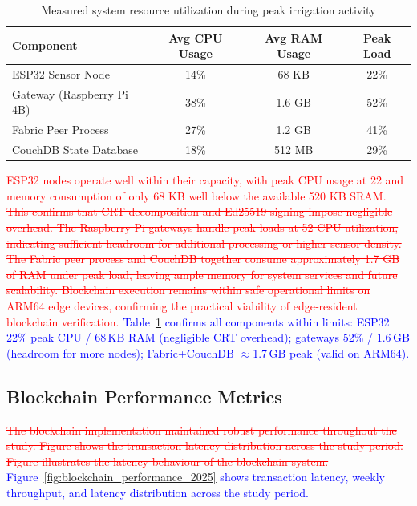 \documentclass[pdflatex,sn-mathphys-num]{sn-jnl}
\theoremstyle{thmstyleone}
\theoremstyle{thmstyletwo}
\theoremstyle{thmstylethree}
\begin{document}
{\begin{table}[htbp]
\centering
\caption{Measured system resource utilization during peak irrigation activity}
\label{tab:resource-utilization}
\scriptsize
\setlength{\tabcolsep}{3pt}
\begin{tabular}{lccc}
\toprule
\textbf{Component} & \textbf{Avg CPU Usage} & \textbf{Avg RAM Usage} & \textbf{Peak Load} \\
\midrule
ESP32 Sensor Node           & 14\%   & 68 KB    & 22\% \\
Gateway (Raspberry Pi 4B)   & 38\%   & 1.6 GB   & 52\% \\
Fabric Peer Process         & 27\%   & 1.2 GB   & 41\% \\
CouchDB State Database      & 18\%   & 512 MB   & 29\% \\
\bottomrule
\end{tabular}
\end{table}

\textcolor{red}{\sout{ESP32 nodes operate well within their capacity, with peak CPU usage at 22 and memory consumption of only 68 KB well below the available 520 KB SRAM. This confirms that CRT decomposition and Ed25519 signing impose negligible overhead. The Raspberry Pi gateways handle peak loads at 52 CPU utilization, indicating sufficient headroom for additional processing or higher sensor density. The Fabric peer process and CouchDB together consume approximately 1.7 GB of RAM under peak load, leaving ample memory for system services and future scalability. Blockchain execution remains within safe operational limits on ARM64 edge devices, confirming the practical viability of edge‑resident blockchain verification.}}
\textcolor{blue}{Table~\ref{tab:resource-utilization} confirms all components within limits: ESP32 22\% peak CPU / 68\,KB RAM (negligible CRT overhead); gateways 52\% / 1.6\,GB (headroom for more nodes); Fabric+CouchDB $\approx$1.7\,GB peak (valid on ARM64).}

\subsection{Blockchain Performance Metrics}
\label{subsec:blockchain_performance}

\textcolor{red}{\sout{The blockchain implementation maintained robust performance throughout the study. Figure shows the transaction latency distribution across the study period. Figure illustrates the latency behaviour of the blockchain system.}}
\textcolor{blue}{Figure~\ref{fig:blockchain_performance_2025} shows transaction latency, weekly throughput, and latency distribution across the study period.}

}
\end{document}
